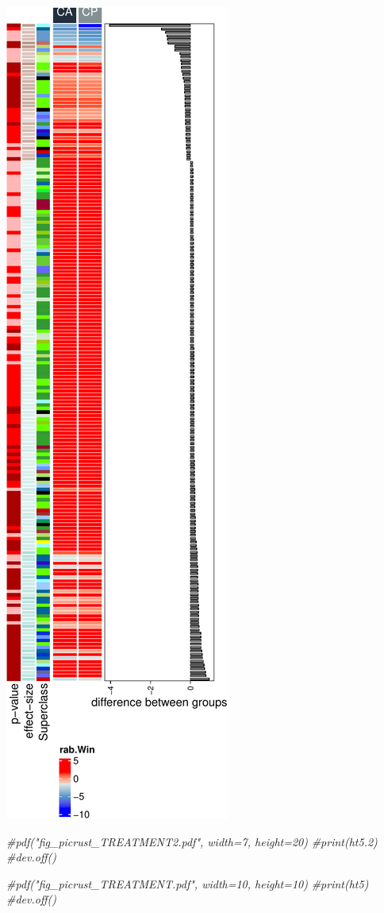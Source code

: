 \documentclass[]{interact}
\theoremstyle{plain}%
\theoremstyle{definition}
\theoremstyle{remark}
\newenvironment{Shaded}{\begin{snugshade}}{\end{snugshade}}
\newcommand{\CommentTok}[1]{\textcolor[rgb]{0.56,0.35,0.01}{\textit{#1}}}
\begin{document}
\begin{center}\includegraphics{Doc_pdf_files/figure-latex/unnamed-chunk-41-1} \end{center}

\begin{Shaded}
\begin{Highlighting}[]
\CommentTok{\#pdf("fig\_picrust\_TREATMENT2.pdf", width=7, height=20)}
\CommentTok{\#print(ht5.2)}
\CommentTok{\#dev.off()}

\CommentTok{\#pdf("fig\_picrust\_TREATMENT.pdf", width=10, height=10)}
\CommentTok{\#print(ht5)}
\CommentTok{\#dev.off()}
\end{Highlighting}
\end{Shaded}
\end{document}
